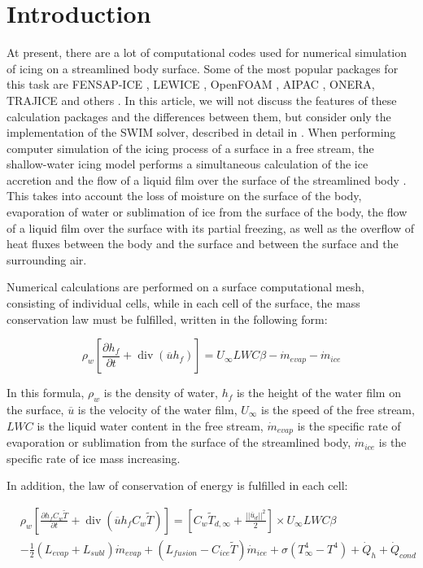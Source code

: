 \documentclass[
11pt,%
tightenlines,%
twoside,%
onecolumn,%
nofloats,%
nobibnotes,%
nofootinbib,%
superscriptaddress,%
noshowpacs,%
centertags]%
{revtex4}
\begin{document}
\section{Introduction}

At present, there are a lot of computational codes used for numerical simulation of icing on a streamlined body surface.
Some of the most popular packages for this task are FENSAP-ICE \cite{Bourgault}, LEWICE \cite{Wright}, OpenFOAM \cite{Beld}, AIPAC \cite{Domingos}, ONERA, TRAJICE and others \cite{Myers}.
In this article, we will not discuss the features of these calculation packages and the differences between them, but consider only the implementation of the SWIM solver, described in detail in \cite{Bourgault}.
When performing computer simulation of the icing process of a surface in a free stream, the shallow-water icing model performs a simultaneous calculation of the ice accretion and the flow of a liquid film over the surface of the streamlined body \cite{Farzaneh}. This takes into account the loss of moisture on the surface of the body, evaporation of water or sublimation of ice from the surface of the body, the flow of a liquid film over the surface with its partial freezing, as well as the overflow of heat fluxes between the body and the surface and between the surface and the surrounding air.

Numerical calculations are performed on a surface computational mesh, consisting of individual cells, while in each cell of the surface, the mass conservation law must be fulfilled, written in the following form:

\begin{equation}
\rho_w \left[ \frac{\partial h_f}{\partial t} + \operatorname{div}(\overline{u} h_f) \right] = U_{\infty} LWC \beta - \dot m_{evap} - \dot m_{ice}
\end{equation}

In this formula, $\rho_w$ is the density of water, $h_f$ is the height of the water film on the surface, $\overline{u}$ is the velocity of the water film, $U_{\infty}$ is the speed of the free stream, $LWC$ is the liquid water content in the free stream, $\dot m_{evap}$ is the specific rate of evaporation or sublimation from the surface of the streamlined body, $\dot m_{ice}$ is the specific rate of ice mass increasing.

In addition, the law of conservation of energy is fulfilled in each cell:

\begin{equation}
\begin{aligned}
& \rho_w \left[ \frac{\partial h_f C_w \tilde{T}}{\partial t} + \operatorname{div}(\overline{u} h_f C_w \tilde{T}) \right] = \left[ C_w \tilde{T}_{d,\infty} + \frac{||\overline{u}_d||^2}{2} \right] \times U_{\infty} LWC \beta
\\
& - \frac{1}{2}(L_{evap} + L_{subl}) \dot m_{evap} + (L_{fusion} - C_{ice} \tilde{T}) \dot m_{ice} + \sigma (T_{\infty}^4 - T^4) + \dot Q_h + \dot Q_{cond}
\end{aligned}
\end{equation}
\end{document}
